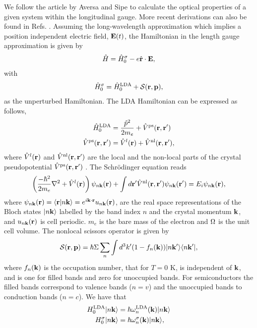 \documentclass[floatfix,prb,aps,superscriptaddress,11pt,preprint,letterpaper]{revtex4}
\begin{document}
We follow the article by Aversa and Sipe\cite{aversaPRB95} to calculate 
the optical properties of a given system within the longitudinal gauge. 
More recent derivations
can also be found in Refs. .  
Assuming the long-wavelength approximation which implies 
a position independent electric field, 
$\mathbf{E}(t)$,  
the Hamiltonian in the length gauge approximation is given by
\begin{equation}\label{ache}
\hat{H}=\hat{H}^\sigma_0-e \hat{\mathbf{r}} \cdot \mathbf{E},
\end{equation}
with
\begin{align}\label{ache.1}
\hat H^\sigma_0=\hat H^{\mathrm{LDA}}_0
 + {\cal S}(\mathbf{r},\mathbf{p})
,
\end{align} 
as the unperturbed Hamiltonian.
The LDA Hamiltonian can be expressed as follows,
\begin{align}\label{ache.2}
\hat H^{\mathrm{LDA}}_0&=\frac{\hat p^2}{2m_e}  + \hat V^{\mathrm{ps}}(\mathbf{r},\mathbf{r}')
\nonumber\\
\hat V^{\mathrm{ps}}(\mathbf{r},\mathbf{r}')
&=\hat V^l(\mathbf{r}) + \hat V^{\mathrm{nl}}(\mathbf{r},\mathbf{r}')
,
\end{align}  
where $\hat V^l(\mathbf{r})$ and $\hat V^{\mathrm{nl}}(\mathbf{r},\mathbf{r}')$ are the local and
the non-local parts of the  
crystal 
pseudopotential $\hat V^{\mathrm{ps}}(\mathbf{r},\mathbf{r}')$ .
The Schr\"odinger equation reads
\begin{align}\label{ache.4} 
\left(
\frac{-\hbar^2}{2m_e}\nabla^2
 + \hat V^l(\mathbf{r})\right)\psi_{n\mathbf{k}}(\mathbf{r})
 + \int d\mathbf{r}'\hat V^{\mathrm{nl}}(\mathbf{r},\mathbf{r}')\psi_{n\mathbf{k}}(\mathbf{r}')
=E_i\psi_{n\mathbf{k}}(\mathbf{r})
,
\end{align} 
where
$\psi_{n\mathbf{k}}(\mathbf{r})=\langle {\mathbf{r}} | {n\mathbf{k}} \rangle=e^{i\mathbf{k}\cdot\mathbf{r}}u_{n\mathbf{k}}(\mathbf{r})$,
are the real space representations of the Bloch states $| n\mathbf{k} \rangle$ labelled
by the band index $n$ and the crystal momentum $\mathbf{k}$, and $u_{n\mathbf{k}}(\mathbf{r})$
is cell periodic. $m_e$ is the bare mass of the electron and $\Omega$ is the 
unit cell volume. The nonlocal scissors operator is given by 
\begin{equation}\label{chon.0}
{\cal S}(\mathbf{r},\mathbf{p})=\hbar\Sigma\sum_n\int d^3k'(1-f_n(\mathbf{k})) | n\mathbf{k}' \rangle\langle n\mathbf{k}' |
,
\end{equation}
where $f_n(\mathbf{k})$ is the occupation number, that for $T=0$ K, is
independent of $\mathbf{k}$, and is one for filled bands and zero for
unoccupied bands. For semiconductors the filled bands correspond to
valence
bands  ($n=v$) and the unoccupied bands to conduction bands
 ($n=c$). 
We have that
\begin{align}\label{chon.1}  
H^{\mathrm{LDA}}_0| n\mathbf{k} \rangle&=\hbar\omega^{\mathrm{LDA}}_n(\mathbf{k})| n\mathbf{k} \rangle
\nonumber\\
H^\sigma_0| n\mathbf{k} \rangle&=\hbar\omega^\sigma_n(\mathbf{k})| n\mathbf{k} \rangle
,
\end{align} 
\end{document}

